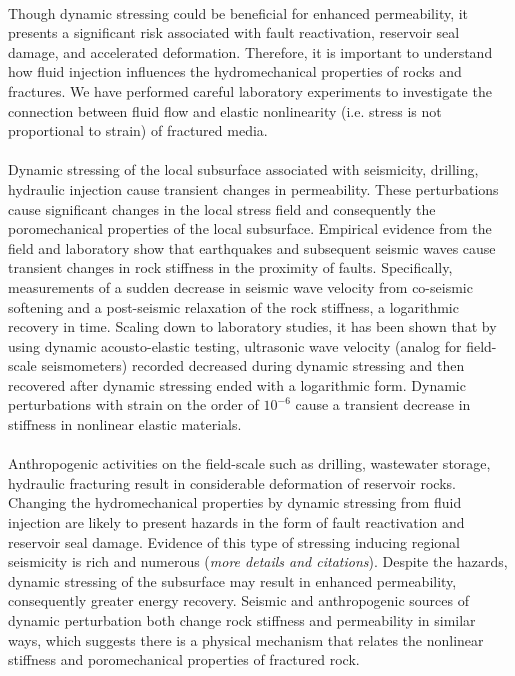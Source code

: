 \documentclass[letterpaper,10pt]{article}
\begin{document}
\paragraph{} Though dynamic stressing could be beneficial for enhanced permeability, it presents a significant risk associated with fault reactivation, reservoir seal damage, and accelerated deformation. Therefore, it is important to understand how fluid injection influences the hydromechanical properties of rocks and fractures. We have performed careful laboratory experiments to investigate the connection between fluid flow and elastic nonlinearity (i.e. stress is not proportional to strain) of fractured media.

\paragraph{} Dynamic stressing of the local subsurface associated with seismicity, drilling, hydraulic injection cause transient changes in permeability. These perturbations cause significant changes in the local stress field and consequently the poromechanical properties of the local subsurface. Empirical evidence from the field and laboratory show that earthquakes and subsequent seismic waves cause transient changes in rock stiffness in the proximity of faults. Specifically, measurements of a sudden decrease in seismic wave velocity from co-seismic softening and a post-seismic relaxation of the rock stiffness, a logarithmic recovery in time. Scaling down to laboratory studies, it has been shown that by using dynamic acousto-elastic testing, ultrasonic wave velocity (analog for field-scale seismometers) recorded decreased during dynamic stressing and then recovered after dynamic stressing ended with a logarithmic form. Dynamic perturbations with strain on the order of $10^{-6}$ cause a transient decrease in stiffness in nonlinear elastic materials. 

\paragraph{} Anthropogenic activities on the field-scale such as drilling, wastewater storage, hydraulic fracturing result in considerable deformation of reservoir rocks. Changing the hydromechanical properties by dynamic stressing from fluid injection are likely to present hazards in the form of fault reactivation and reservoir seal damage. Evidence of this type of stressing inducing regional seismicity is rich and numerous (\textit{more details and citations}). Despite the hazards, dynamic stressing of the subsurface may result in enhanced permeability, consequently greater energy recovery. 
Seismic and anthropogenic sources of dynamic perturbation both change rock stiffness and permeability in similar ways, which suggests there is a physical mechanism that relates the nonlinear stiffness and poromechanical properties of fractured rock.
\end{document}

